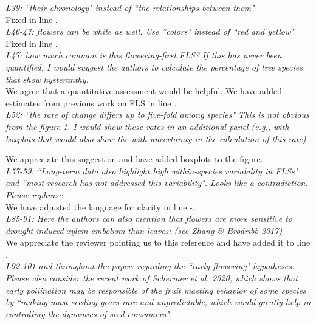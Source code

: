 \documentclass{article}[11pt]
\begin{document}
\emph{L39: ``their chronology" instead of ``the relationships between them"}\\

Fixed in line .\\

\emph{L46-47: flowers can be white as well. Use ''colors" instead of ``red and yellow"}\\

Fixed in line .\\

\emph{L47: how much common is this flowering-first FLS? If this has never been quantified, I would suggest the authors to calculate the percentage of tree species that show hysteranthy.}\\

\noindent We agree that a quantitative assessment would be helpful. We have added estimates from previous work on FLS \citep{Gougherty2018} in line .\\

\emph{L52: ``the rate of change differs up to five-fold among species" This is not obvious from the figure 1. I would show these rates in an additional panel (e.g., with boxplots that would also show the with uncertainty in the calculation of this rate)}

\noindent We appreciate this suggestion and have added boxplots to the figure.\\

\emph{L57-59: ``Long-term data also highlight high within-species variability in FLSs" and ``most research has not addressed this variability". Looks like a contradiction. Please rephrase}\\

\noindent  We have adjusted the language for clarity in line -.\\

\emph{L85-91: Here the authors can also mention that flowers are more sensitive to drought-induced xylem embolism than leaves: (see Zhang \& Brodribb 2017)}\\

\noindent We appreciate the reviewer pointing us to this reference and have added it to line .\\

\emph{L92-101 and throughout the paper: regarding the ``early flowering" hypotheses. Please also consider the recent work of Schermer et al. 2020, which shows that early pollination may be responsible of the fruit masting behavior of some species by ``making mast seeding years rare and unpredictable, which would greatly help in controlling the dynamics of seed consumers".}\\
\end{document}
